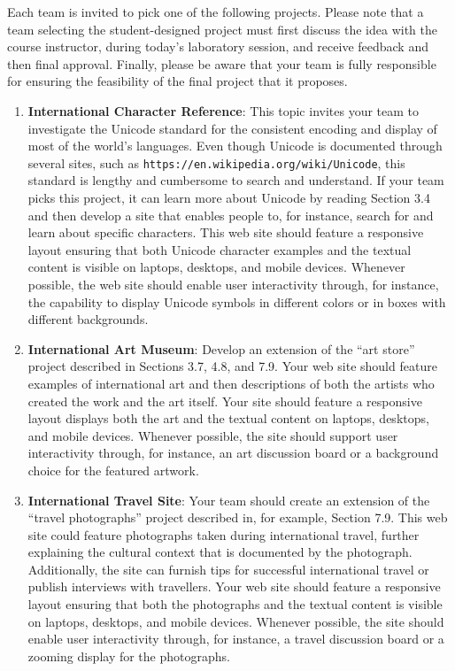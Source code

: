 \documentclass[11pt]{article}
\newcommand{\url}[1]{\lstinline{#1}}
\begin{document}
Each team is invited to pick one of the following projects. Please note that a
team selecting the student-designed project must first discuss the idea with the
course instructor, during today's laboratory session, and receive feedback and
then final approval. Finally, please be aware that your team is fully
responsible for ensuring the feasibility of the final project that it proposes.

\begin{enumerate}

  \setlength{\itemsep}{0in}

  \item {\bf International Character Reference}: This topic invites your team to
    investigate the Unicode standard for the consistent encoding and display of
    most of the world's languages. Even though Unicode is documented through
    several sites, such as \url{https://en.wikipedia.org/wiki/Unicode}, this
    standard is lengthy and cumbersome to search and understand. If your team
    picks this project, it can learn more about Unicode by reading Section 3.4
    and then develop a site that enables people to, for instance, search for and
    learn about specific characters. This web site should feature a responsive
    layout ensuring that both Unicode character examples and the textual content
    is visible on laptops, desktops, and mobile devices. Whenever possible, the
    web site should enable user interactivity through, for instance, the
    capability to display Unicode symbols in different colors or in boxes with
    different backgrounds.

  \item {\bf International Art Museum}: Develop an extension of the ``art
    store'' project described in Sections 3.7, 4.8, and 7.9. Your web site
    should feature examples of international art and then descriptions of both
    the artists who created the work and the art itself. Your site should
    feature a responsive layout displays both the art and the textual content on
    laptops, desktops, and mobile devices. Whenever possible, the site should
    support user interactivity through, for instance, an art discussion board or
    a background choice for the featured artwork.

  \item {\bf International Travel Site}: Your team should create an extension of
    the ``travel photographs'' project described in, for example, Section 7.9.
    This web site could feature photographs taken during international travel,
    further explaining the cultural context that is documented by the
    photograph. Additionally, the site can furnish tips for successful
    international travel or publish interviews with travellers. Your web site
    should feature a responsive layout ensuring that both the photographs and
    the textual content is visible on laptops, desktops, and mobile devices.
    Whenever possible, the site should enable user interactivity through, for
    instance, a travel discussion board or a zooming display for the photographs.


\end{enumerate}
\end{document}
